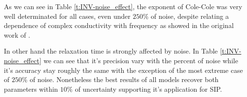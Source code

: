 \documentclass{vie16}
\begin{document}
As we can see in Table \ref{t:INV-noise_effect}, the exponent of
Cole-Cole was very well determinated for all cases, even under $250\%$
of noise, despite relating a dependence of complex conductivity with
frequency as showed in the original work of \citet{cole41}.

In other hand the relaxation time is strongly affected by noise. In Table \ref{t:INV-noise_effect} we can see that it's precision vary with the 
percent of noise while it's accuracy stay roughly the same with the exception of the most extreme case of $250\%$ of noise. Nonetheless the best 
results of all models recover both parameters within $10\%$ of uncertainty supporting it's application for SIP.

\begin{table}[H]
\centering
\caption{Noise effect on the inversion of Cole-Cole parameters}
\label{t:INV-noise_effect}
\end{table}
\end{document}
